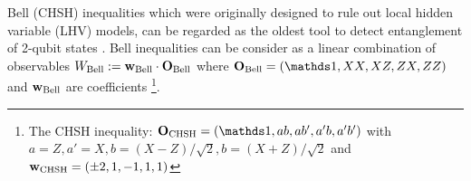 \documentclass[
reprint,
aps,
pra,
floatfix,
]{revtex4-2}
\theoremstyle{plain}
\theoremstyle{definition}
\newtheorem{definition}{Definition}
\newtheorem{problem}{Problem}
\newtheorem{remark}{Remark}
\newcommand{\ew}{W}
\newcommand{\pob}{O}
\newcommand{\dm}{\rho}
\newcommand{\chsh}{\textup{CHSH}}
\newcommand{\bellineq}{\textup{Bell}}
\newcommand{\px}{X}
\newcommand{\pz}{Z}
\begin{document}


Bell (CHSH) inequalities which were originally designed to rule out local hidden variable (LHV) models,
can be regarded as the oldest tool to detect entanglement of 2-qubit states \cite{terhalBellInequalitiesSeparability2000}.
Bell inequalities can be consider as a linear combination of observables $\ew_{\bellineq}:=\vb{w}_{\bellineq}\cdot\vb{\pob}_{\bellineq}$
where $\vb{\pob}_{\bellineq}=\qty(\identity, XX,XZ,ZX,ZZ )$ and $\vb{w}_{\bellineq}$ are coefficients
\footnote{
	The CHSH inequality:
	$\vb{\pob}_{\chsh}=\qty(\identity, a b, a b', a' b, a' b' )$ with 
	$a = \pz, a' = \px, b = (\px-\pz)/\sqrt{2}, b = (\px+\pz)/\sqrt{2}$
	and $\vb{w}_{\chsh} = \qty(\pm 2, 1, -1, 1, 1)$
}.
\end{document}
